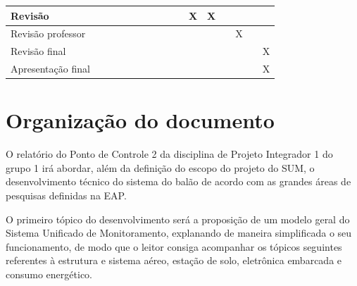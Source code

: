 \begin{table}[H]
\begin{tabular}{|p{2.5cm}|p{0.5cm}|p{0.5cm}|p{0.5cm}|p{0.5cm}|p{0.5cm}|p{0.5cm}|p{0.5cm}|p{0.5cm}|p{0.5cm}|p{0.5cm}|p{0.5cm}|p{0.5cm}|p{0.5cm}|p{0.5cm}|p{0.5cm}|}
Revisão               &                           &                           &                           &                           &                           &                           &                           &                           &                           & \cellcolor{blue}X & \cellcolor{blue}X &       &                           &       &                           \\ \hline
Revisão professor     &                           &                           &                           &                           &                           &                           &                           &                           &                           &                           &                           &       & \cellcolor{blue}X &       &                           \\ \hline
Revisão final         &                           &                           &                           &                           &                           &                           &                           &                           &                           &                           &                           &       &                           &       & \cellcolor{blue}X \\ \hline
Apresentação final    &                           &                           &                           &                           &                           &                           &                           &                           &                           &                           &                           &       &                           &       & \cellcolor{blue}X \\ \hline
\end{tabular}
  \label{tab:cronograma3}
\end{table}

\section{Organização do documento} %
\label{sec:organiza_o_do_documento}

  O relatório do Ponto de Controle 2 da disciplina de Projeto Integrador 1 do grupo 1 irá abordar, além da definição do escopo do projeto do SUM, o desenvolvimento técnico do sistema do balão de acordo com as grandes áreas de pesquisas definidas na EAP.

  O primeiro tópico do desenvolvimento será a proposição de um modelo geral do Sistema Unificado de Monitoramento, explanando de maneira simplificada o seu funcionamento, de modo que o leitor consiga acompanhar os tópicos seguintes referentes à estrutura e sistema aéreo, estação de solo, eletrônica embarcada e consumo energético.

